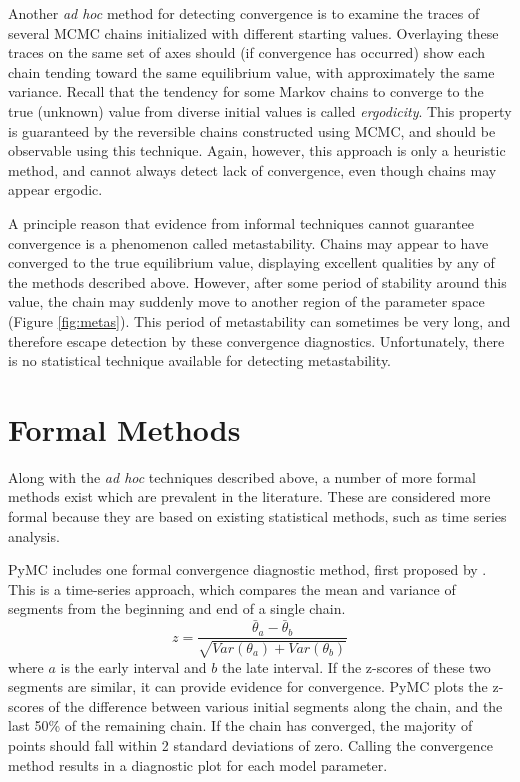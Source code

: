\documentclass[]{book}
\begin{document}
Another \emph{ad hoc} method for detecting convergence is to examine the traces of several MCMC chains initialized with different starting values. Overlaying these traces on the same set of axes should (if convergence has occurred) show each chain tending toward the same equilibrium value, with approximately the same variance. Recall that the tendency for some Markov chains to converge to the true (unknown) value from diverse initial values is called \emph{ergodicity}. This property is guaranteed by the reversible chains constructed using MCMC, and should be observable using this technique. Again, however, this approach is only a heuristic method, and cannot always detect lack of convergence, even though chains may appear ergodic.

A principle reason that evidence from informal techniques cannot guarantee convergence is a phenomenon called metastability. Chains may appear to have converged to the true equilibrium value, displaying excellent qualities by any of the methods described above. However, after some period of stability around this value, the chain may suddenly move to another region of the parameter space (Figure \ref{fig:metas}). This period of metastability can sometimes be very long, and therefore escape detection by these convergence diagnostics. Unfortunately, there is no statistical technique available for detecting metastability.

\section*{Formal Methods}

Along with the \emph{ad hoc} techniques described above, a number of more formal methods exist which are prevalent in the literature. These are considered more formal because they are based on existing statistical methods, such as time series analysis.

PyMC includes one formal convergence diagnostic method, first proposed by \citet{Geweke:1992gm}. This is a time-series approach, which compares the mean and variance of segments from the beginning and end of a single chain.
\begin{equation}
z = \frac{\bar{\theta}_a - \bar{\theta}_b}{\sqrt{Var(\theta_a) + Var(\theta_b)}}
\end{equation}
where $a$ is the early interval and $b$ the late interval. If the z-scores of these two segments are similar, it can provide evidence for convergence. PyMC plots the z-scores of the difference between various initial segments along the chain, and the last 50\% of the remaining chain. If the chain has converged, the majority of points should fall within 2 standard deviations of zero. Calling the convergence method results in a diagnostic plot for each model parameter.
\end{document}
